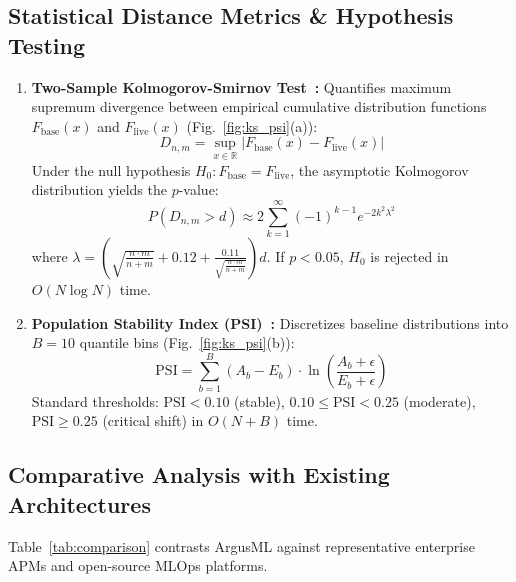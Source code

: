 \documentclass[conference]{IEEEtran}
\begin{document}
\subsection{Statistical Distance Metrics \& Hypothesis Testing}
\begin{enumerate}
    \item \textbf{Two-Sample Kolmogorov-Smirnov Test~\cite{massey1951}:} Quantifies maximum supremum divergence between empirical cumulative distribution functions $F_{\text{base}}(x)$ and $F_{\text{live}}(x)$ (Fig.~\ref{fig:ks_psi}(a)):
    \begin{equation}
    D_{n, m} = \sup_{x \in \mathbb{R}} \left| F_{\text{base}}(x) - F_{\text{live}}(x) \right|
    \end{equation}
    Under the null hypothesis $H_0: F_{\text{base}} = F_{\text{live}}$, the asymptotic Kolmogorov distribution yields the $p$-value:
    \begin{equation}
    P(D_{n, m} > d) \approx 2 \sum_{k=1}^\infty (-1)^{k-1} e^{-2 k^2 \lambda^2}
    \end{equation}
    where $\lambda = \left( \sqrt{\frac{n \cdot m}{n + m}} + 0.12 + \frac{0.11}{\sqrt{\frac{n \cdot m}{n + m}}} \right) d$. If $p < 0.05$, $H_0$ is rejected in $O(N \log N)$ time.
    \item \textbf{Population Stability Index (PSI)~\cite{yurdakul2018}:} Discretizes baseline distributions into $B = 10$ quantile bins (Fig.~\ref{fig:ks_psi}(b)):
    \begin{equation}
    \text{PSI} = \sum_{b=1}^B (A_b - E_b) \cdot \ln\left( \frac{A_b + \epsilon}{E_b + \epsilon} \right)
    \end{equation}
    Standard thresholds: $\text{PSI} < 0.10$ (stable), $0.10 \le \text{PSI} < 0.25$ (moderate), $\text{PSI} \ge 0.25$ (critical shift) in $O(N+B)$ time.
\end{enumerate}

\subsection{Comparative Analysis with Existing Architectures}
Table~\ref{tab:comparison} contrasts ArgusML against representative enterprise APMs and open-source MLOps platforms.
\end{document}
